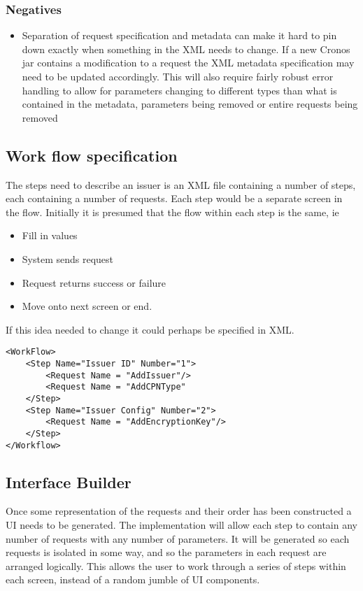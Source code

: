 \documentclass[a4paper,12pt, titlepage]{article}
\begin{document}
		\subsubsection{Negatives}
		\begin{itemize}
		\item Separation of request specification and metadata can make it hard to pin down exactly when something in the XML needs to change. If a new Cronos jar contains a modification to a request the XML metadata specification may need to be updated accordingly. This will also require fairly robust error handling to allow for parameters changing to different types than what is contained in the metadata, parameters being removed or entire requests being removed
		\end{itemize}

	\subsection{Work flow specification} The steps need to describe an issuer is an XML file containing a number of steps, each containing a number of requests. Each step would be a separate screen in the flow. Initially it is presumed that the flow within each step is the same, ie
	\begin{itemize}
	\item Fill in values
	\item System sends request
	\item Request returns success or failure
	\item Move onto next screen or end.
	\end{itemize}
	If this idea needed to change it could perhaps be specified in XML.
	\begin{verbatim}
<WorkFlow>
    <Step Name="Issuer ID" Number="1">
        <Request Name = "AddIssuer"/>
        <Request Name = "AddCPNType"
    </Step>
    <Step Name="Issuer Config" Number="2">
        <Request Name = "AddEncryptionKey"/>
    </Step>
</Workflow>
	\end{verbatim}

	\subsection{Interface Builder}
	Once some representation of the requests and their order has been constructed a UI needs to be generated. The implementation will allow each step to contain any number of requests with any number of parameters. It will be generated so each requests is isolated in some way, and so the parameters in each request are arranged logically. This allows the user to work through a series of steps within each screen, instead of a random jumble of UI components.
\end{document}
